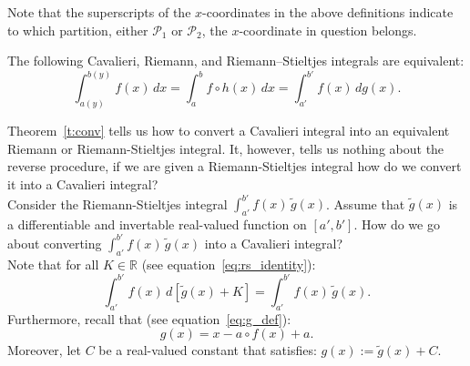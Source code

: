 \documentclass[twoside,reqno,11pt]{fcaa-var} %
\begin{document}
\noindent
Note that the superscripts of the $x$-coordinates in the above definitions indicate to which partition, either $\mathcal{P}_1$ or $\mathcal{P}_2$, the $x$-coordinate in question belongs.

\begin{theorem}
\label{t:conv}
The following Cavalieri, Riemann, and Riemann--Stieltjes integrals are equivalent:
\begin{equation}
\int_{a(y)}^{b(y)} f(x)\,dx = \int_a^b f\circ h(x)\,dx = \int_{a'}^{b'} f(x)\,dg(x).
\end{equation}
\end{theorem}

\noindent
Theorem~\ref{t:conv} tells us how to convert a Cavalieri integral into an equivalent Riemann or Riemann-Stieltjes integral. It, however, tells us nothing about the reverse procedure, if we are given a Riemann-Stieltjes integral how do we convert it into a Cavalieri integral?\\ 

\noindent
Consider the Riemann-Stieltjes integral $\int_{a'}^{b'} f(x)\,\widetilde{g}(x)$. Assume that $\widetilde{g}(x)$ is a differentiable and invertable real-valued function on $[a',b']$. How do we go about converting $\int_{a'}^{b'} f(x)\,\widetilde{g}(x)$ into a Cavalieri integral?\\ 

\noindent
Note that for all $K\in\mathbb{R}$ (see equation~\eqref{eq:rs_identity}):
\begin{equation}
\int_{a'}^{b'} f(x)\,d[\widetilde{g}(x)+K] = \int_{a'}^{b'}f(x)\,\widetilde{g}(x). 
\end{equation}
Furthermore, recall that (see equation~\ref{eq:g_def}):
\begin{equation}
\label{eq:g_definition}
g(x) = x - a\circ f(x) + a.
\end{equation}
Moreover, let $C$ be a real-valued constant that satisfies: $g(x) := \widetilde{g}(x)+C$.\\
\end{document}
